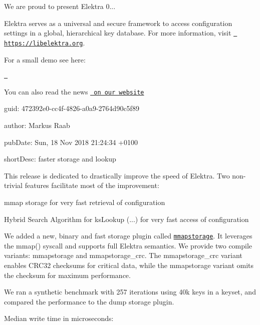 We are proud to present Elektra 0...

Elektra serves as a universal and secure framework to access configuration settings in a global, hierarchical key database. For more information, visit \href{https://libelektra.org}{\texttt{ https\+://libelektra.\+org}}.

For a small demo see here\+:

\href{https://asciinema.org/a/cantr04assr4jkv8v34uz9b8r}{\texttt{ }}

You can also read the news \href{https://www.libelektra.org/news/0.8.25-release}{\texttt{ on our website}}


\begin{DoxyItemize}
\item guid\+: 472392e0-\/cc4f-\/4826-\/a0a9-\/2764d90c5f89
\item author\+: Markus Raab
\item pub\+Date\+: Sun, 18 Nov 2018 21\+:24\+:34 +0100
\item short\+Desc\+: faster storage and lookup
\end{DoxyItemize}

This release is dedicated to drastically improve the speed of Elektra. Two non-\/trivial features facilitate most of the improvement\+:


\begin{DoxyItemize}
\item mmap storage for very fast retrieval of configuration
\item Hybrid Search Algorithm for {\ttfamily ks\+Lookup (...)} for very fast access of configuration
\end{DoxyItemize}

We added a new, binary and fast storage plugin called \href{https://libelektra.org/plugins/mmapstorage}{\texttt{ {\ttfamily mmapstorage}}}. It leverages the {\ttfamily mmap()} syscall and supports full Elektra semantics. We provide two compile variants\+: {\ttfamily mmapstorage} and {\ttfamily mmapstorage\+\_\+crc}. The {\ttfamily mmapstorage\+\_\+crc} variant enables C\+R\+C32 checksums for critical data, while the {\ttfamily mmapstorage} variant omits the checksum for maximum performance.

We ran a synthetic benchmark with 257 iterations using 40k keys in a keyset, and compared the performance to the {\ttfamily dump} storage plugin.

Median write time in microseconds\+:

